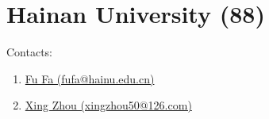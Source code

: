 \section{Hainan University (88)}
\label{sec:HU}

Contacts:\begin{enumerate}
 \item {}\href{mailto:fufa@hainu.edu.cn}{Fu Fa (fufa@hainu.edu.cn)}
 \item {}\href{mailto:xingzhou50@126.com}{Xing Zhou (xingzhou50@126.com)}
\end{enumerate}

